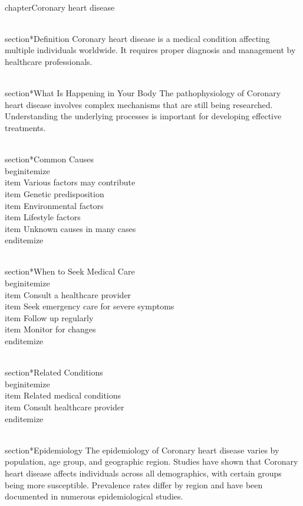 
\\chapter{Coronary heart disease}

\\section*{Definition}
Coronary heart disease is a medical condition affecting multiple individuals worldwide. It requires proper diagnosis and management by healthcare professionals.

\\section*{What Is Happening in Your Body}
The pathophysiology of Coronary heart disease involves complex mechanisms that are still being researched. Understanding the underlying processes is important for developing effective treatments.

\\section*{Common Causes}
\\begin{itemize}
\\item Various factors may contribute\n  \\item Genetic predisposition\n  \\item Environmental factors\n  \\item Lifestyle factors\n  \\item Unknown causes in many cases
\\end{itemize}

\\section*{When to Seek Medical Care}
\\begin{itemize}
\\item Consult a healthcare provider\n  \\item Seek emergency care for severe symptoms\n  \\item Follow up regularly\n  \\item Monitor for changes
\\end{itemize}

\\section*{Related Conditions}
\\begin{itemize}
\\item Related medical conditions\n  \\item Consult healthcare provider
\\end{itemize}

\\section*{Epidemiology}
The epidemiology of Coronary heart disease varies by population, age group, and geographic region. Studies have shown that Coronary heart disease affects individuals across all demographics, with certain groups being more susceptible. Prevalence rates differ by region and have been documented in numerous epidemiological studies.

